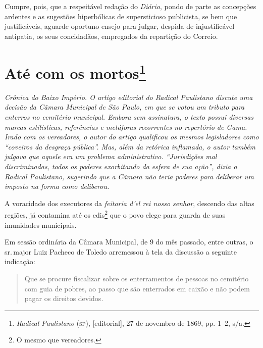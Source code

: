 Cumpre, pois, que a respeitável redação do \emph{Diário}, pondo de parte
as concepções ardentes e as sugestões hiperbólicas de supersticioso
publicista, se bem que justificáveis, aguarde oportuno ensejo para
julgar, despida de injustificável antipatia, os seus concidadãos,
empregados da repartição do Correio.

\chapter{Até com os mortos\footnote{\emph{Radical Paulistano} (\textsc{sp}),
  {[}editorial{]}, 27 de novembro de 1869, pp. 1--2, s/a.}}

\begin{didascalia}\itshape
Crônica do Baixo Império. O artigo editorial do \textnormal{Radical Paulistano}
discute uma decisão da Câmara Municipal de São Paulo, em que se
votou um tributo para enterros no cemitério municipal. Embora sem
assinatura, o texto possui diversas marcas estilísticas, referências e
metáforas recorrentes no repertório de Gama. Irado com os vereadores, o
autor do artigo qualificou os mesmos legisladores como ``coveiros da
desgraça pública''. Mas, além da retórica inflamada, o autor também
julgava que aquele era um problema administrativo. ``Jurisdições mal
discriminadas, todos os poderes exorbitando da esfera de sua ação'',
dizia o \textnormal{Radical Paulistano}, sugerindo que a Câmara não teria
poderes para deliberar um imposto na forma como deliberou.
\end{didascalia}



A voracidade dos executores da \emph{feitoria d'el rei nosso senhor},
descendo das altas regiões, já contamina até os edis\footnote{O mesmo
  que vereadores.} que o povo elege para guarda de suas imunidades
municipais.

Em sessão ordinária da Câmara Municipal, de 9 do mês passado, entre
outras, o sr.\,major Luiz Pacheco de Toledo arremessou à tela da
discussão a seguinte indicação:

\begin{quote}
Que se procure fiscalizar sobre os enterramentos de pessoas no
cemitério com guia de pobres, ao passo que são enterrados em caixão e
não podem pagar os direitos devidos.
\end{quote}

